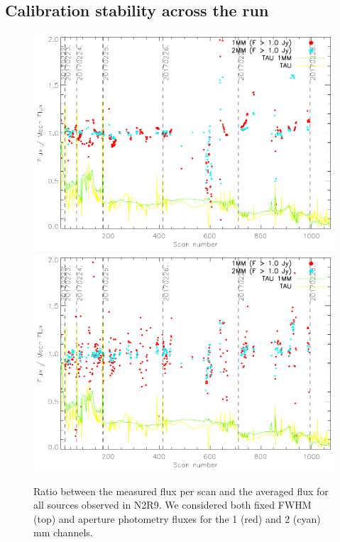 \subsection{Calibration stability across the run}

\begin{figure}[ht]
\begin{center}
\includegraphics[clip, angle=0, scale = 0.7]{Figures/FluxIndScans/flux_ratio_run22.pdf}
\includegraphics[clip, angle=0, scale = 0.7]{Figures/FluxIndScans/flux_ap_ratio_run22.pdf}
\caption[N2R9 flux stability]{Ratio between the measured flux per scan and the averaged flux for all sources observed in N2R9. We considered both fixed FWHM (top) and aperture photometry fluxes for the 1 (red) and 2 (cyan) mm channels. }
\label{fig:fluxvsscan}
\end{center}
\end{figure}

